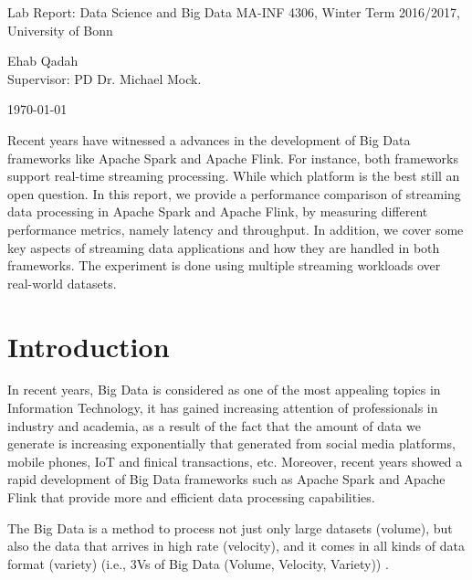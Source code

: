 \documentclass[]{article}
\begin{document}
\begin{flushleft}

\vspace{4pt}

\centering
 Lab Report: Data Science and Big Data MA-INF 4306,
 Winter Term 2016/2017, University of Bonn

\vspace{4pt}
\centering
 Ehab Qadah\\
 Supervisor: PD Dr. Michael Mock.
 \vspace{4pt}
 
 \today
\end{flushleft}


\begin{abstract}

\end{abstract}
Recent years have witnessed a advances in the  development of Big Data frameworks like Apache Spark and Apache Flink. For instance, both frameworks support real-time
streaming processing. While which platform is the best still an open question. 
In this report, we provide a performance comparison of streaming data processing in Apache Spark and Apache Flink, by measuring different performance metrics, namely latency and throughput. In addition, we cover some key aspects of streaming data applications and how they are handled in both frameworks. The experiment is done using multiple streaming workloads over real-world datasets.
\section{Introduction}

\par In recent years, Big Data is considered as one of the most appealing topics in Information Technology, it has gained increasing attention of professionals in industry and academia, as a result of the fact that the amount of data we generate is increasing exponentially \cite{idc} that generated from social media platforms, mobile phones, IoT and finical transactions, etc. Moreover, recent years showed a rapid development of Big Data frameworks such as Apache Spark and Apache Flink that provide more and efficient data processing capabilities.
 \par The Big Data is a method to process not just only large datasets (volume), but also the data that arrives in high rate (velocity), and it comes in all kinds of data format (variety) (i.e., 3Vs of Big Data (Volume, Velocity, Variety)) \cite{svs}.
\end{document}
